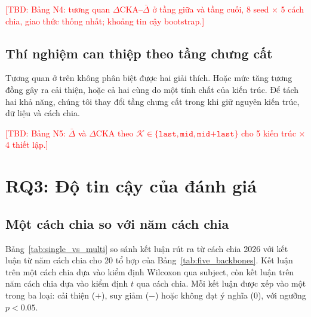\documentclass[10pt]{article} %
\newcommand{\tbd}[1]{\textcolor{red}{[TBD: #1]}}
\begin{document}
\tbd{Bảng N4: tương quan $\Delta$CKA--$\bar\Delta$ ở tầng giữa và tầng cuối, 8 seed $\times$ 5 cách chia, giao thức thống nhất; khoảng tin cậy bootstrap.}

\subsection{Thí nghiệm can thiệp theo tầng chưng cất}
\label{sec:layer_intervention}

Tương quan ở trên không phân biệt được hai giải thích. Hoặc mức tăng tương đồng gây ra cải thiện, hoặc cả hai cùng do một tính chất của kiến trúc. Để tách hai khả năng, chúng tôi thay đổi tầng chưng cất trong khi giữ nguyên kiến trúc, dữ liệu và cách chia.

\tbd{Bảng N5: $\bar\Delta$ và $\Delta$CKA theo $\mathcal{K} \in \{\texttt{last}, \texttt{mid}, \texttt{mid+last}\}$ cho 5 kiến trúc $\times$ 4 thiết lập.}

\section{RQ3: Độ tin cậy của đánh giá}
\label{sec:rq3}
\label{sec:mc_multisplit}

\subsection{Một cách chia so với năm cách chia}

Bảng~\ref{tab:single_vs_multi} so sánh kết luận rút ra từ cách chia 2026 với kết luận từ năm cách chia cho 20 tổ hợp của Bảng~\ref{tab:five_backbones}. Kết luận trên một cách chia dựa vào kiểm định Wilcoxon qua subject, còn kết luận trên năm cách chia dựa vào kiểm định $t$ qua cách chia. Mỗi kết luận được xếp vào một trong ba loại: cải thiện ($+$), suy giảm ($-$) hoặc không đạt ý nghĩa ($0$), với ngưỡng $p<0.05$.
\end{document}
